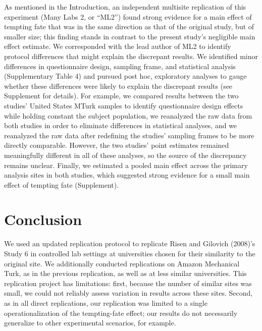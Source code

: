 \documentclass[english,floatsintext,man]{apa6}
\newcounter{author}
\theoremstyle{definition}
\theoremstyle{definition}
\theoremstyle{definition}
\theoremstyle{remark}
\begin{document}
As mentioned in the Introduction, an independent multisite replication
of this experiment (Many Labs 2, or \enquote{ML2}) found strong evidence
for a main effect of tempting fate that was in the same direction as
that of the original study, but of smaller size; this finding stands in
contrast to the present study's negligible main effect estimate. We
corresponded with the lead author of ML2 to identify protocol
differences that might explain the discrepant results. We identified
minor differences in questionnaire design, sampling frame, and
statistical analysis (Supplementary Table 4) and pursued post hoc,
exploratory analyses to gauge whether these differences were likely to
explain the discrepant results (see Supplement for details). For
example, we compared results between the two studies' United States
MTurk samples to identify questionnaire design effects while holding
constant the subject population, we reanalyzed the raw data from both
studies in order to eliminate differences in statistical analyses, and
we reanalyzed the raw data after redefining the studies' sampling frames
to be more directly comparable. However, the two studies' point
estimates remained meaningfully different in all of these analyses, so
the source of the discrepancy remains unclear. Finally, we estimated a
pooled main effect across the primary analysis sites in both studies,
which suggested strong evidence for a small main effect of tempting fate
(Supplement).

\section{Conclusion}\label{conclusion}

We used an updated replication protocol to replicate Risen and Gilovich
(2008)'s Study 6 in controlled lab settings at universities chosen for
their similarity to the original site. We additionally conducted
replications on Amazon Mechanical Turk, as in the previous replication,
as well as at less similar universities. This replication project has
limitations: first, because the number of similar sites was small, we
could not reliably assess variation in results across these sites.
Second, as in all direct replications, our replication was limited to a
single operationalization of the tempting-fate effect; our results do
not necessarily generalize to other experimental scenarios, for example.
\end{document}
